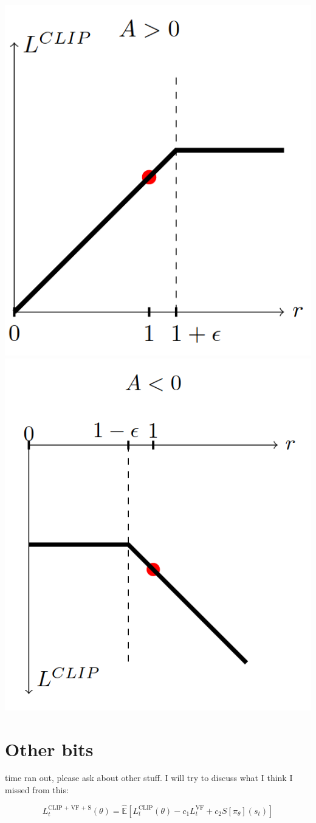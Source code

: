 \documentclass{article}
\begin{document}
\includegraphics[scale=0.4]{fig1.png}
\includegraphics[scale=0.4]{fig2.png}

\section{Other bits}

time ran out, please ask about other stuff. I will try to discuss what I think I missed from this:

\[L_t^{\text{CLIP + VF + S}} (\theta) = \hat{\mathbb{E}} \left [ L_t^{\text{CLIP}}(\theta) - c_1 L_t^{\text{VF}} + c_2 S[\pi_\theta](s_t) \right] \]
\end{document}
